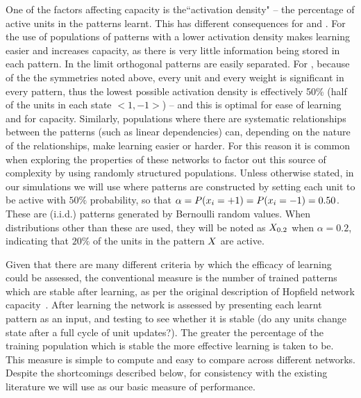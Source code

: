 One of the factors affecting capacity is the``activation density" -- the percentage of active units in the patterns learnt.  This has different consequences for   and  .  For  the use of populations of patterns with a lower activation density makes learning easier and increases capacity, as there is very little information being stored in each pattern. In the limit orthogonal patterns are easily separated.  For  , because of the the symmetries noted above, every unit and every weight is significant in every pattern, thus the lowest possible activation density is effectively 50\% (half of the units in each state $<1, -1>$) -- and this is optimal for ease of learning and for capacity.  Similarly, populations where there are systematic relationships between the patterns (such as linear dependencies) can, depending on the nature of the relationships, make learning easier or harder.  For this reason it is common when exploring the properties of these networks to factor out this source of complexity by using randomly structured populations.  Unless otherwise stated, in our simulations we will use  where patterns are constructed by setting each unit to be active with $50\%$ probability, so that $\alpha=P(x_i=+1)=P(x_i=-1)=0.50$. These are  (i.i.d.) patterns generated by Bernoulli random values.  When distributions other than these are used, they will be noted as $X_{0.2}$ when $\alpha=0.2$, indicating that $20\%$ of the units in the pattern $X_{}$ are active. 
  


Given that there are many different criteria by which the efficacy of learning could be assessed, the conventional measure is the number of trained patterns which are stable after learning, as per the original description of Hopfield network capacity~\citep{Hopfield1982}.  After learning the network is assessed by presenting each learnt pattern as an input, and testing to see whether it is stable (do any units change state after a full cycle of unit updates?).  The greater the percentage of the training population which is stable the more effective learning is taken to be.  This  measure is simple to compute and easy to compare across different networks.  Despite the shortcomings described below, for consistency with the existing literature we will use  as our basic measure of performance.

